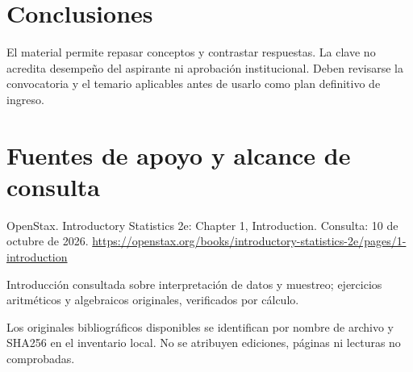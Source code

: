 \section{Conclusiones}
El material permite repasar conceptos y contrastar respuestas. La clave no acredita desempeño del aspirante ni aprobación institucional. Deben revisarse la convocatoria y el temario aplicables antes de usarlo como plan definitivo de ingreso.
\clearpage\section{Fuentes de apoyo y alcance de consulta}
OpenStax. Introductory Statistics 2e: Chapter 1, Introduction. Consulta: 10 de octubre de 2026. \url{https://openstax.org/books/introductory-statistics-2e/pages/1-introduction}\par Introducción consultada sobre interpretación de datos y muestreo; ejercicios aritméticos y algebraicos originales, verificados por cálculo.\par\medskip
Los originales bibliográficos disponibles se identifican por nombre de archivo y SHA256 en el inventario local. No se atribuyen ediciones, páginas ni lecturas no comprobadas.

